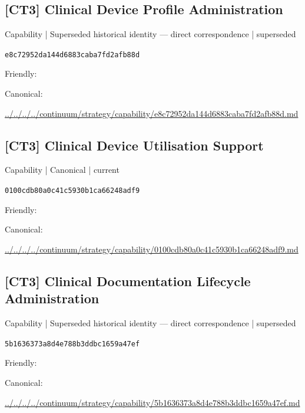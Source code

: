 \documentclass[10pt,a4paper]{article}
\begin{document}
\subsection*{[CT3] Clinical Device Profile Administration}
{\small Capability | Superseded historical identity — direct correspondence | superseded}\par
\texttt{e8c72952da144d6883caba7fd2afb88d}\par
Friendly: \par
Canonical: \par
{\footnotesize\url{../../../../continuum/strategy/capability/e8c72952da144d6883caba7fd2afb88d.md}}\par
\subsection*{[CT3] Clinical Device Utilisation Support}
{\small Capability | Canonical | current}\par
\texttt{0100cdb80a0c41c5930b1ca66248adf9}\par
Friendly: \par
Canonical: \par
{\footnotesize\url{../../../../continuum/strategy/capability/0100cdb80a0c41c5930b1ca66248adf9.md}}\par
\subsection*{[CT3] Clinical Documentation Lifecycle Administration}
{\small Capability | Superseded historical identity — direct correspondence | superseded}\par
\texttt{5b1636373a8d4e788b3ddbc1659a47ef}\par
Friendly: \par
Canonical: \par
{\footnotesize\url{../../../../continuum/strategy/capability/5b1636373a8d4e788b3ddbc1659a47ef.md}}\par
\end{document}
